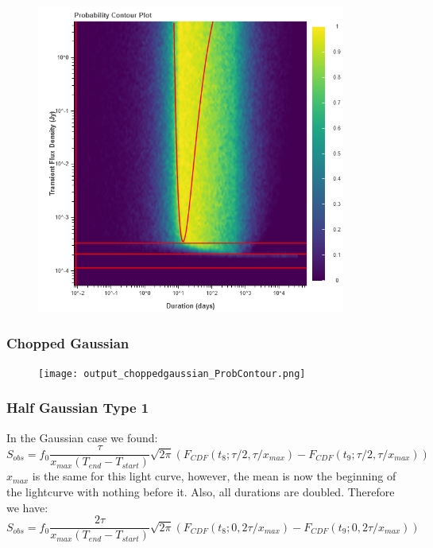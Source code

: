 \documentclass{article}
\begin{document}
\begin{figure}[H] 
	\begin{center}
		\includegraphics[width=4in]{output_gaussian_ProbContour.png}
		
		\label{gaussian}
	\end{center}
\end{figure}
\subsubsection{Chopped Gaussian}
\begin{figure}[H] 
	\begin{center}
		\texttt{[image: output\_choppedgaussian\_ProbContour.png]}
		
		\label{choppedgaussian}
	\end{center}
\end{figure}
\subsubsection{Half Gaussian Type 1}
In the Gaussian case we found:
\[S_{obs} = f_0 \frac{\tau}{x_{max}(T_{end} - T_{start})}\sqrt{2\pi}(F_{CDF}(t_8; \tau/2,\tau/x_{max}) -F_{CDF}(t_9; \tau/2, \tau/x_{max}))\]
$x_{max}$ is the same for this light curve, however, the mean is now the beginning of the lightcurve with nothing before it. Also, all durations are doubled. Therefore we have:
\[S_{obs} = f_0 \frac{2\tau}{x_{max}(T_{end} - T_{start})}\sqrt{2\pi}(F_{CDF}(t_8; 0,2\tau/x_{max}) -F_{CDF}(t_9; 0, 2\tau/x_{max}))\]
\end{document}
